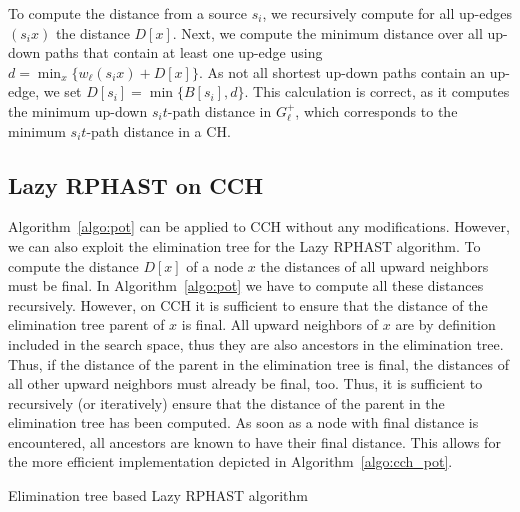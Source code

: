 \documentclass[manuscript,review]{acmart}
\begin{document}
To compute the distance from a source $s_i$, we recursively compute for all up-edges $(s_i x)$ the distance $D[x]$.
Next, we compute the minimum distance over all up-down paths that contain at least one up-edge using $d = \min_x\{w_\ell(s_i x) + D[x]\}$.
As not all shortest up-down paths contain an up-edge, we set $D[s_i] = \min \{ B[s_i], d \}$.
This calculation is correct, as it computes the minimum up-down $s_it$-path distance in $G^+_\ell$, which corresponds to the minimum $s_it$-path distance in a CH.

\subsection{Lazy RPHAST on CCH}

Algorithm~\ref{algo:pot} can be applied to CCH without any modifications.
However, we can also exploit the elimination tree for the Lazy RPHAST algorithm.
To compute the distance $D[x]$ of a node $x$ the distances of all upward neighbors must be final.
In Algorithm~\ref{algo:pot} we have to compute all these distances recursively.
However, on CCH it is sufficient to ensure that the distance of the elimination tree parent of $x$ is final.
All upward neighbors of $x$ are by definition included in the search space, thus they are also ancestors in the elimination tree.
Thus, if the distance of the parent in the elimination tree is final, the distances of all other upward neighbors must already be final, too.
Thus, it is sufficient to recursively (or iteratively) ensure that the distance of the parent in the elimination tree has been computed.
As soon as a node with final distance is encountered, all ancestors are known to have their final distance.
This allows for the more efficient implementation depicted in Algorithm~\ref{algo:cch_pot}.

\begin{algorithm2e}
\caption{Elimination tree based Lazy RPHAST algorithm}
\label{algo:cch_pot}
\end{algorithm2e}
\end{document}
